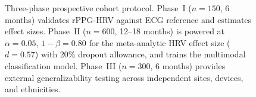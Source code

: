 \begin{figure}[t]
\begin{tikzpicture}
\end{tikzpicture}
\caption{Three-phase prospective cohort protocol.
Phase~I ($n=150$, 6 months) validates rPPG-HRV against ECG reference and estimates
effect sizes. Phase~II ($n=600$, 12--18 months) is powered at $\alpha=0.05$,
$1-\beta=0.80$ for the meta-analytic HRV effect size ($d=0.57$) with 20\% dropout
allowance, and trains the multimodal classification model.
Phase~III ($n=300$, 6 months) provides external generalizability testing
across independent sites, devices, and ethnicities.}
\label{fig:cohort}
\end{figure}


%
%
%
%
%   
%
%
%
%
%
